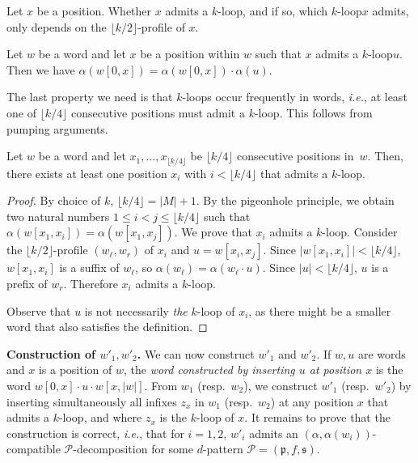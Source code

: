\documentclass{LMCS}
\newcommand\Ps{\ensuremath{\mathcal{P}}\xspace}
\newcommand\kloop{$k$-loop\xspace}
\newcommand\kloops{$k$-loops\xspace}
\newcommand\profile[1]{$#1$-profile\xspace}
\newcommand\decop[1]{\ensuremath{#1}-decomposition\xspace}
\newcommand\pfsdecomp{\decop{\Ps}}
\newcommand\frp{\ensuremath{\mathfrak{p}}\xspace}
\newcommand\frs{\ensuremath{\mathfrak{s}}\xspace}
\let\leq\leqslant
\theoremstyle{plain}
\begin{document}
\begin{fact} \label{fct:profloop}
  Let $x$ be a position. Whether $x$ admits a \kloop, and if so, which \kloop $x$ admits, 
  only depends on the \profile{\lfloor k/2\rfloor} of $x$.
\end{fact}

\begin{fact} \label{fct:tloop}
  Let $w$ be a word and let $x$ be a position within $w$ such that $x$ admits a
  \kloop $u$. Then we have $\alpha(w[0,x]) = \alpha(w[0,x])
  \cdot \alpha(u)$. 
\end{fact}

The last property we need is that \kloops occur frequently in words,
\emph{i.e.}, at least one of $\lfloor k/4\rfloor$ consecutive positions must
admit a \kloop. This follows from pumping arguments.

\begin{lem} \label{lem:cloop} Let $w$ be a word and let
  $x_1,\ldots,x_{\lfloor k/4\rfloor}$ be $\lfloor k/4\rfloor$
  consecutive positions in~$w$. Then, there exists at least one
  position $x_i$ with $i < \lfloor k/4\rfloor$  that admits a \kloop.
\end{lem}

\begin{proof}
  By choice of $k$, $\lfloor k/4\rfloor=|M|+1$. By the
  pigeonhole principle, we obtain two natural numbers $1 \leq i < j \leq \lfloor k/4\rfloor$ 
such that
  $\alpha(w[x_1,x_i])=\alpha(w[x_1,x_j])$. We prove that $x_i$
  admits a \kloop. Consider the \profile{ \lfloor k/2\rfloor}
  $(w_\ell,w_r)$ of $x_i$ and $u=w[x_i,x_j]$. Since
  $|w[x_1,x_i]|<\lfloor k/4\rfloor$, $w[x_1,x_i]$ is a suffix of
  $w_\ell$, so
  $\alpha(w_\ell) = \alpha(w_\ell \cdot u)$. Since $|u| < \lfloor
  k/4\rfloor$, $u$ is a prefix of $w_r$. Therefore $x_i$ admits a \kloop.

  Observe that $u$ is not necessarily \emph{the} \kloop of $x_i$, as there
  might be a smaller word that also satisfies the definition.
\end{proof}

\medskip
\noindent
{\bf Construction of $w'_1,w'_2$.} We can now construct $w'_1$ and
$w'_2$. If $w,u$ are words and $x$ is a position of $w$, the
\emph{word constructed by inserting $u$ at position $x$} is the word
$w[0,x] \cdot u \cdot w[x,|w|]$. From $w_1$ (resp.~$w_2$), we
construct $w'_1$ (resp.~$w'_2$) by inserting simultaneously all
infixes $z_x$ in $w_1$ (resp.~$w_2$) at any position $x$ that admits a
\kloop, and where $z_x$ is the \kloop of $x$. It remains to prove that
the construction is correct, \emph{i.e.}, that for $i=1,2$, $w'_i$ admits an
$(\alpha,\alpha(w_i))$-compatible \pfsdecomp for some $d$-pattern
$\Ps=(\frp,f,\frs)$.
\end{document}
